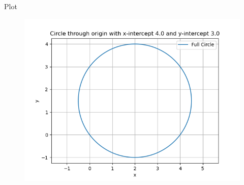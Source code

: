 \documentclass{beamer}
\begin{document}
\begin{frame}{Plot}
    \begin{figure}
        \centering
        \includegraphics[width=0.7\linewidth]{./figs/Figure_1.png}
        \caption{}
        \label{fig:fig1}
    \end{figure}
\end{frame}
\end{document}
